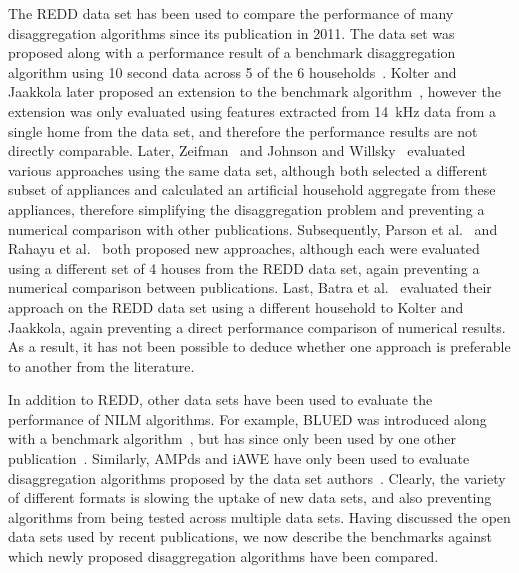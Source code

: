 \documentclass{sig-alternate}
\newcommand{\bluecolor}[1]{\textcolor{blue}{#1}}
\begin{document}
The REDD data set has been used to compare the performance of many disaggregation algorithms since its publication in 2011. The data set was proposed along with a performance result of a benchmark disaggregation algorithm using 10 second data across 5 of the 6 households~\cite{REDD}. Kolter and Jaakkola later proposed an extension to the benchmark algorithm~\cite{kolter_2012}, however the extension was only evaluated using features extracted from 14~kHz data from a single home from the data set, and therefore the performance results are not directly comparable. Later, Zeifman~\cite{zeifman_2012} and Johnson and Willsky~\cite{johnson_2013} evaluated various approaches using the same data set, although both selected a different subset of appliances and calculated an artificial household aggregate from these appliances, therefore simplifying the disaggregation problem and preventing a numerical comparison with other publications. Subsequently, Parson et al.~\cite{parson_2012} and Rahayu et al.~\cite{rahayu_2012} both proposed new approaches, although each were evaluated using a different set of 4 houses from the REDD data set, again preventing a numerical comparison between publications. Last, Batra et al.~\cite{batra_2013} evaluated their approach on the REDD data set using a different household to Kolter and Jaakkola, again preventing a direct performance comparison of numerical results. As a result, it has not been possible to deduce whether one approach is preferable to another from the literature.

In addition to REDD, other data sets have been used to evaluate the performance of NILM algorithms. For example, BLUED was introduced along with a benchmark algorithm~\cite{blued}, but has since only been used by one other publication~\cite{anderson_2012}. Similarly, AMPds and iAWE have only been used to evaluate disaggregation algorithms proposed by the data set authors~\cite{ampds,iawe}. Clearly, the variety of different formats is slowing the uptake of new data sets, and also preventing algorithms from being tested across multiple data sets. Having discussed the open data sets used by recent publications, we now describe the benchmarks against which newly proposed disaggregation algorithms have been compared.
\end{document}
